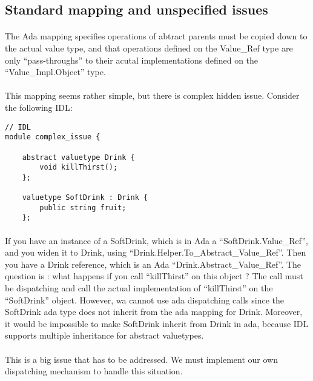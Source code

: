 \subsection{Standard mapping and unspecified issues}
\paragraph{} The Ada mapping specifies operations of abtract parents
must be copied down to the actual value type, and that operations
defined on the Value\_Ref type are only ``pass-throughs'' to their
acutal implementations defined on the ``Value\_Impl.Object'' type.

\paragraph{}This mapping seems rather simple, but there is complex
hidden issue. Consider the following IDL:

\begin{verbatim}
// IDL
module complex_issue {

	abstract valuetype Drink {
		void killThirst();
	};

	valuetype SoftDrink : Drink {
		public string fruit;
	};
\end{verbatim}

\paragraph{} If you have an instance of a SoftDrink, which is in Ada a
``SoftDrink.Value\_Ref'', and you widen it to Drink, using
``Drink.Helper.To\_Abstract\_Value\_Ref''. Then you have a Drink
reference, which is an Ada ``Drink.Abstract\_Value\_Ref''. The
question is : what happens if you call ``killThirst'' on this object ?
The call must be dispatching and call the actual implementation of
``killThirst'' on the ``SoftDrink'' object. However, wa cannot use ada
dispatching calls since the SoftDrink ada type does not inherit from
the ada mapping for Drink. Moreover, it would be impossible to make
SoftDrink inherit from Drink in ada, because IDL supports multiple
inheritance for abstract valuetypes.

\paragraph{}This is a big issue that has to be addressed. We must
implement our own dispatching mechanism to handle this situation.

